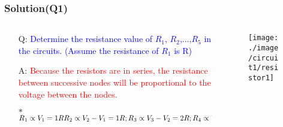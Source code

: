\documentclass{beamer}
\newcommand{\blue}[1]{\textcolor{blue}{#1}}
\newcommand{\red}[1]{\textcolor{red}{#1}}
\begin{document}
\begin{frame}
\frametitle{Solution(Q1)}
\begin{columns}
\begin{column}{6cm}
\begin{itemize} \itemsep1pt \parskip0pt 
  \item[Q:] \blue{Determine the resistance value of $R_1$, $R_2$,...,$R_5$ in the circuits. (Assume the resistance of $R_1$ is R)}
  \item[A:] \red{Because the resistors are in series, the resistance between successive nodes will be proportional to the voltage between the nodes.}
  \item[$\ast$] $R_1\propto V_1=1R \newline R_2\propto V_2-V_1=1R; \newline R_3\propto V_3-V_2=2R; \newline R_4\propto V_4-V_3=4R; \newline R_5\propto V_5-V_4=2R;$
\end{itemize}
\end{column}

\begin{column}{6cm}
\begin{figure}[H]
  \label{epi_circuit1}
  \centering
  \texttt{[image: ./image/circuit1/resistor1]}
\end{figure}
\end{column}
\end{columns}

\end{frame}

\end{document}
